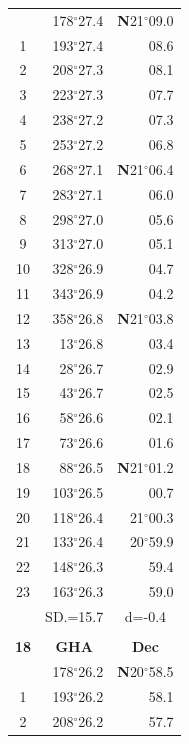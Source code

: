 \documentclass[10pt, a4paper]{report}
\begin{document}
\begin{scriptsize}
\begin{tabular*}{0.2\textwidth}[t]{@{\extracolsep{\fill}}|c|rr|}
\hline\rule{0pt}{2.6ex}\noindent
0 & 178$^\circ$27.4 & \textbf{N}21$^\circ$09.0\\
1 & 193$^\circ$27.4 & 08.6\\
2 & 208$^\circ$27.3 & 08.1\\
3 & 223$^\circ$27.3 & \raisebox{0.24ex}{\boldmath$\cdot$~\boldmath$\cdot$~~}07.7\\
4 & 238$^\circ$27.2 & 07.3\\
5 & 253$^\circ$27.2 & 06.8\\[2Pt]
6 & 268$^\circ$27.1 & \textbf{N}21$^\circ$06.4\\
7 & 283$^\circ$27.1 & 06.0\\
8 & 298$^\circ$27.0 & 05.6\\
9 & 313$^\circ$27.0 & \raisebox{0.24ex}{\boldmath$\cdot$~\boldmath$\cdot$~~}05.1\\
10 & 328$^\circ$26.9 & 04.7\\
11 & 343$^\circ$26.9 & 04.2\\[2Pt]
12 & 358$^\circ$26.8 & \textbf{N}21$^\circ$03.8\\
13 & 13$^\circ$26.8 & 03.4\\
14 & 28$^\circ$26.7 & 02.9\\
15 & 43$^\circ$26.7 & \raisebox{0.24ex}{\boldmath$\cdot$~\boldmath$\cdot$~~}02.5\\
16 & 58$^\circ$26.6 & 02.1\\
17 & 73$^\circ$26.6 & 01.6\\[2Pt]
18 & 88$^\circ$26.5 & \textbf{N}21$^\circ$01.2\\
19 & 103$^\circ$26.5 & 00.7\\
20 & 118$^\circ$26.4 & 21$^\circ$00.3\\
21 & 133$^\circ$26.4 & 20$^\circ$59.9\\
22 & 148$^\circ$26.3 & 59.4\\
23 & 163$^\circ$26.3 & 59.0\\
\hline
\rule{0pt}{2.4ex} & \multicolumn{1}{c}{SD.=15.7} & \multicolumn{1}{c|}{d=-0.4}\\
\hline
\multicolumn{1}{c}{}\\[-0.5ex]\hline
\multicolumn{1}{|c|}{\rule{0pt}{2.6ex}\textbf{18}} & \multicolumn{1}{c}{\textbf{GHA}} & \multicolumn{1}{c|}{\textbf{Dec}}\\
\hline\rule{0pt}{2.6ex}\noindent
0 & 178$^\circ$26.2 & \textbf{N}20$^\circ$58.5\\
1 & 193$^\circ$26.2 & 58.1\\
2 & 208$^\circ$26.2 & 57.7\\

\end{tabular*}
\end{scriptsize}
\end{document}
